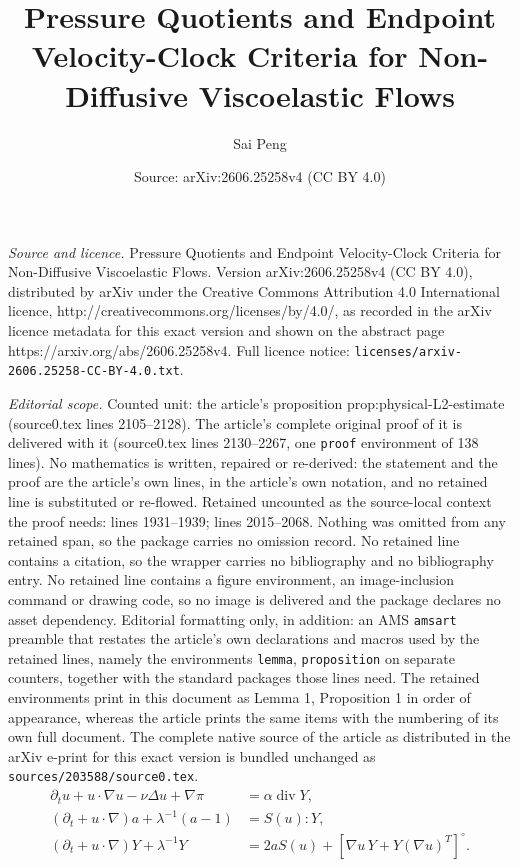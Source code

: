 \documentclass[10pt,a4paper]{amsart}
\title{Pressure Quotients and Endpoint Velocity-Clock Criteria for Non-Diffusive Viscoelastic Flows}
\author{Sai Peng}
\date{Source: arXiv:2606.25258v4 (CC BY 4.0)}
\newcommand{\divv}{\operatorname{div}}
\begin{document}
\maketitle

\noindent\emph{Source and licence.} Pressure Quotients and Endpoint Velocity-Clock Criteria for Non-Diffusive Viscoelastic Flows. Version arXiv:2606.25258v4 (CC BY 4.0), distributed by arXiv under the Creative Commons Attribution 4.0 International licence, http://creativecommons.org/licenses/by/4.0/, as recorded in the arXiv licence metadata for this exact version and shown on the abstract page https://arxiv.org/abs/2606.25258v4. Full licence notice: \texttt{licenses/arxiv-2606.25258-CC-BY-4.0.txt}.\par\smallskip

\noindent\textit{Editorial scope.} Counted unit: the article's proposition prop:physical-L2-estimate (source0.tex lines 2105--2128). The article's complete original proof of it is delivered with it (source0.tex lines 2130--2267, one \texttt{proof} environment of 138 lines). No mathematics is written, repaired or re-derived: the statement and the proof are the article's own lines, in the article's own notation, and no retained line is substituted or re-flowed.  Retained uncounted as the source-local context the proof needs: lines 1931--1939; lines 2015--2068.  Nothing was omitted from any retained span, so the package carries no omission record.  No retained line contains a citation, so the wrapper carries no bibliography and no bibliography entry.  No retained line contains a figure environment, an image-inclusion command or drawing code, so no image is delivered and the package declares no asset dependency.  Editorial formatting only, in addition: an AMS \texttt{amsart} preamble that restates the article's own declarations and macros used by the retained lines, namely the environments \texttt{lemma}, \texttt{proposition} on separate counters, together with the standard packages those lines need.  The retained environments print in this document as Lemma 1, Proposition 1 in order of appearance, whereas the article prints the same items with the numbering of its own full document.  The complete native source of the article as distributed in the arXiv e-print for this exact version is bundled unchanged as \texttt{sources/203588/source0.tex}.
\begin{align}
  \partial_tu+u\cdot\nabla u-\nu\Delta u+\nabla\pi
    &=\alpha\divv Y, \label{eq:physical-u}\\
  (\partial_t+u\cdot\nabla)a+\lambda^{-1}(a-1)&=S(u):Y,
    \label{eq:physical-a}\\
  (\partial_t+u\cdot\nabla)Y+\lambda^{-1}Y
    &=2aS(u)+[\nabla u\,Y+Y(\nabla u)^T]^\circ .
    \label{eq:physical-Y}
\end{align}
\end{document}
